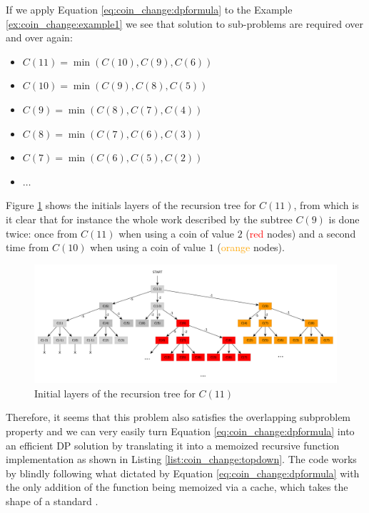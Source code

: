 If we apply Equation \ref{eq:coin_change:dpformula} to the Example \ref{ex:coin_change:example1} we see that solution to sub-problems are required over and over again:
\begin{itemize}
	\item $C(11) = \min(C(10),C(9), C(6))$
	\item $C(10) = \min(C(9),C(8), C(5))$
	\item $C(9) = \min(C(8),C(7), C(4))$
	\item $C(8) = \min(C(7),C(6), C(3))$
	\item $C(7) = \min(C(6),C(5), C(2))$
	\item $\ldots$
\end{itemize}
Figure \ref{fig:coin_change:DPtree} shows the initials layers of the recursion tree for $C(11)$, from which is it clear that for instance the whole work described by the subtree $C(9)$ is done twice: once from  $C(11)$ when using a coin of value $2$ (\textcolor{red}{red} nodes) and a second time from $C(10)$ when using a coin of value $1$ (\textcolor{orange}{orange} nodes).

\begin{figure}
	\centering
	\includegraphics[width=\textwidth]{sources/coin_change/images/DPtree}
	\caption{Initial layers of the recursion tree for $C(11)$}
	\label{fig:coin_change:DPtree}
\end{figure}

Therefore, it seems that this problem also satisfies the overlapping subproblem property and we can very easily turn Equation \ref{eq:coin_change:dpformula} into an efficient DP solution by translating it into a memoized recursive function implementation as shown in Listing \ref{list:coin_change:topdown}. The code works by blindly following what dictated by Equation \ref{eq:coin_change:dpformula} with the only addition of the function  being memoized via a cache, which takes the shape of a standard .

